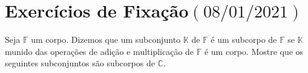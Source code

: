 \chapter{Exercícios de Fixação\quad$\left(08/01/2021\right)$}

\begin{questions}
  \question\label{exercício:1}

  Seja $\mathbb{F}$ um corpo.
  Dizemos que um subconjunto $\mathbb{K}$ de $\mathbb{F}$ é um
  subcorpo de $\mathbb{F}$ se $\mathbb{K}$ munido das operações de
  adição e multiplicação de $\mathbb{F}$ é um corpo.
  Mostre que os seguintes subconjuntos são subcorpos de $\mathbb{C}$.

  \begin{parts}
  \end{parts}

  \begin{solutionordottedlines}
    \begin{parts}

\end{parts}
\end{solutionordottedlines}
\end{questions}
